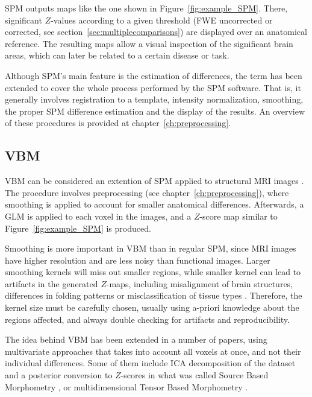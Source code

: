 \ac{SPM} outputs maps like the one shown in Figure~\ref{fig:example_SPM}. There, significant $Z$-values according to a given threshold (\ac{FWE} uncorrected or corrected, see section~\ref{sec:multiplecomparisons}) are displayed over an anatomical reference.  The resulting maps allow a visual inspection of the significant brain areas, which can later be related to a certain disease or task. 

Although \ac{SPM}'s main feature is the estimation of differences, the term has been extended to cover the whole process performed by the \ac{SPM} software. That is, it generally involves registration to a template, intensity normalization, smoothing, the proper \ac{SPM} difference estimation and the display of the results. An overview of these procedures is provided at chapter~\ref{ch:preprocessing}. 

\subsection{\acf{VBM}}
\acf{VBM} can be considered an extention of \ac{SPM} applied to structural \ac{MRI} images \cite{Ashburner2000}. The procedure involves preprocessing (see chapter~\ref{ch:preprocessing}), where smoothing is applied to account for smaller anatomical differences. Afterwards, a \ac{GLM} is applied to each voxel in the images, and a $Z$-score map similar to Figure~\ref{fig:example_SPM} is produced. 

Smoothing is more important in \ac{VBM} than in regular \ac{SPM}, since \ac{MRI} images have higher resolution and are less noisy than functional images. Larger smoothing kernels will miss out smaller regions, while smaller kernel can lead to artifacts in the generated $Z$-maps, including misalignment of brain structures, differences in folding patterns or misclassification of tissue types \cite{Martinez-Murcia2016book}. Therefore, the kernel size must be carefully chosen, usually using a-priori knowledge about the regions affected, and always double checking for artifacts and reproducibility. 

The idea behind \ac{VBM} has been extended in a number of papers, using multivariate approaches that takes into account all voxels at once, and not their individual differences. Some of them include \ac{ICA} decomposition of the dataset and a posterior conversion to $Z$-scores in what was called Source Based Morphometry \cite{Xu2009}, or multidimensional Tensor Based Morphometry \cite{bossa2010tensor}. 

